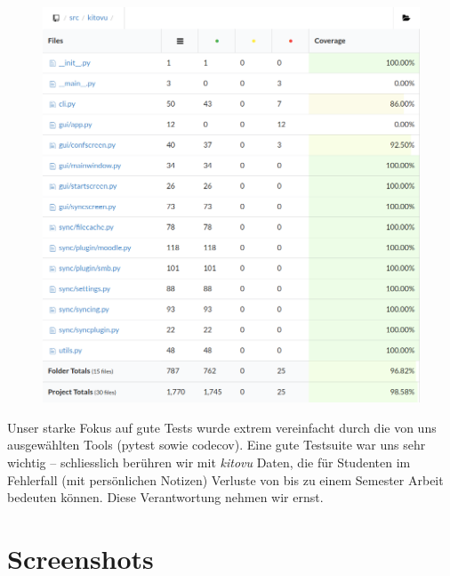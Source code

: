 \documentclass[a4paper]{article}
\let\oldsection\section
\renewcommand\section{\clearpage\oldsection}
\begin{document}
\begin{figure}
\includegraphics[width=0.97\linewidth]{img/coverage_files.png}
\end{figure}

Unser starke Fokus auf gute Tests wurde extrem vereinfacht durch die von uns
ausgewählten Tools (pytest sowie codecov). Eine gute Testsuite war uns sehr
wichtig -- schliesslich berühren wir mit \emph{kitovu} Daten, die für Studenten
im Fehlerfall (mit persönlichen Notizen) Verluste von bis zu einem Semester
Arbeit bedeuten können. Diese Verantwortung nehmen wir ernst.

\section{Screenshots}
\end{document}
